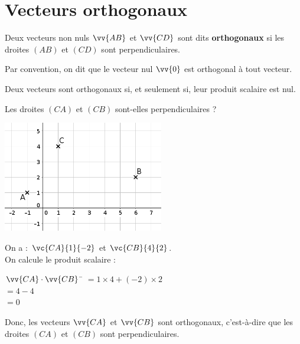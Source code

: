 \documentclass[a4paper,11pt,cours]{nsi} %
\begin{document}
\section{Vecteurs orthogonaux}
\begin{definition}[]
    Deux vecteurs non nuls $\vv{AB}$ et $\vv{CD}$ sont dits \textbf{orthogonaux} si les droites $(AB)$ et $(CD)$ sont perpendiculaires.
\end{definition}

\begin{remarque}[]
    Par convention, on dit que le vecteur nul $\vv{0}$ est orthogonal à tout vecteur.
\end{remarque}

\begin{propriete}[]
    Deux vecteurs sont orthogonaux si, et seulement si, leur produit scalaire est nul.
\end{propriete}

\begin{exemple}[]
    Les droites $(CA)$ et $(CB)$ sont-elles perpendiculaires ?
    \begin{center}
        \includegraphics[width=7cm]{exemple6.png}
    \end{center}
    On a : $\vc{CA}{1}{-2}$ et $\vc{CB}{4}{2}$.\\[.5em]
    On calcule le produit scalaire :
    \begin{tabbing}
        $\vv{CA} \cdot \vv{CB}$ \= $=1\times 4 + (-2)\times 2$\\
        \> $=4 - 4$\\
        \> $=0$
    \end{tabbing}
    Donc, les vecteurs $\vv{CA}$ et $\vv{CB}$ sont orthogonaux, c'est-à-dire que les
    droites $(CA)$ et $(CB)$ sont perpendiculaires.
\end{exemple}
\end{document}
